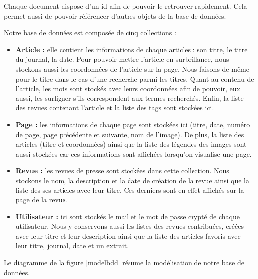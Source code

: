 Chaque document dispose d’un id afin de pouvoir le retrouver rapidement. Cela permet aussi de pouvoir référencer d’autres objets de la base de données. 

Notre base de données est composée de cinq collections :
\begin{itemize}
	\item \textbf{Article :} elle contient les informations de chaque articles : son titre, le titre du journal, la date. Pour pouvoir mettre l'article en surbrillance, nous stockons aussi les coordonnées de l'article sur la page. Nous faisons de même pour le titre dans le cas d'une recherche parmi les  titres. Quant au contenu de l'article, les mots sont stockés avec leurs coordonnées afin de pouvoir, eux aussi, les surligner s'ils correspondent aux termes recherchés. Enfin, la liste des revues contenant l'article et la liste des tags sont stockées ici.
	\item \textbf{Page :} les informations de chaque page sont stockées ici (titre, date, numéro de page, page précédente et suivante, nom de l'image). De plus, la liste des articles (titre et coordonnées) ainsi que la liste des légendes des images sont aussi stockées car ces informations sont affichées lorsqu'on visualise une page.
	\item \textbf{Revue :} les revues de presse sont stockées dans cette collection. Nous stockons le nom, la description et la date de création de la revue ainsi que la liste des ses articles avec leur titre. Ces derniers sont en effet affichés sur la page de la revue.
	\item \textbf{Utilisateur :} ici sont stockés le mail et le mot de passe crypté de chaque utilisateur. Nous y conservons aussi les listes des revues contribuées, créées avec leur titre et leur description ainsi que la liste des articles favoris avec leur titre, journal, date et un extrait.
	\end{itemize}


Le diagramme de la figure \ref{modelbdd} résume la modélisation de notre base de données.


